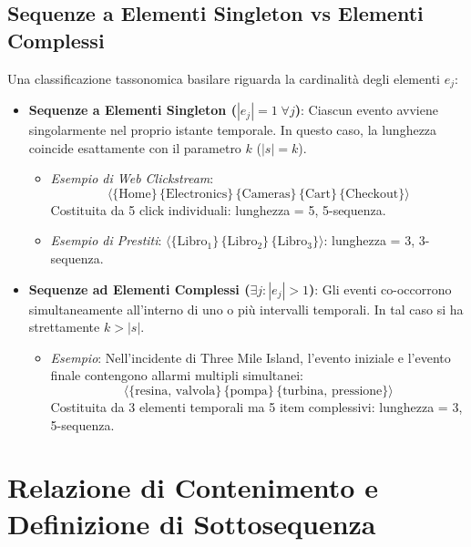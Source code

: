 \subsection{Sequenze a Elementi Singleton vs Elementi Complessi}
Una classificazione tassonomica basilare riguarda la cardinalità degli elementi $e_j$:
\begin{itemize}
    \item \textbf{Sequenze a Elementi Singleton ($|e_j| = 1 \; \forall j$)}: Ciascun evento avviene singolarmente nel proprio istante temporale.
    In questo caso, la lunghezza coincide esattamente con il parametro $k$ ($|s| = k$).
    \begin{itemize}
        \item \textit{Esempio di Web Clickstream}:
        \begin{equation*}
        \langle \{\text{Home}\} \, \{\text{Electronics}\} \, \{\text{Cameras}\} \, \{\text{Cart}\} \, \{\text{Checkout}\} \rangle
        \end{equation*}
        Costituita da 5 click individuali: lunghezza = 5, 5-sequenza.
        \item \textit{Esempio di Prestiti}:
        $\langle \{\text{Libro}_1\} \, \{\text{Libro}_2\} \, \{\text{Libro}_3\} \rangle$: lunghezza = 3, 3-sequenza.
    \end{itemize}
    \item \textbf{Sequenze ad Elementi Complessi ($\exists j : |e_j| > 1$)}: Gli eventi co-occorrono simultaneamente all'interno di uno o più intervalli temporali. In tal caso si ha strettamente $k > |s|$.
    \begin{itemize}
        \item \textit{Esempio}: Nell'incidente di Three Mile Island, l'evento iniziale e l'evento finale contengono allarmi multipli simultanei:
        \begin{equation*}
        \langle \{\text{resina, valvola}\} \, \{\text{pompa}\} \, \{\text{turbina, pressione}\} \rangle
        \end{equation*}
        Costituita da 3 elementi temporali ma 5 item complessivi: lunghezza = 3, 5-sequenza.
    \end{itemize}
\end{itemize}

\FloatBarrier
\section{Relazione di Contenimento e Definizione di Sottosequenza}
\label{sec:dm-seq-subsequence}

